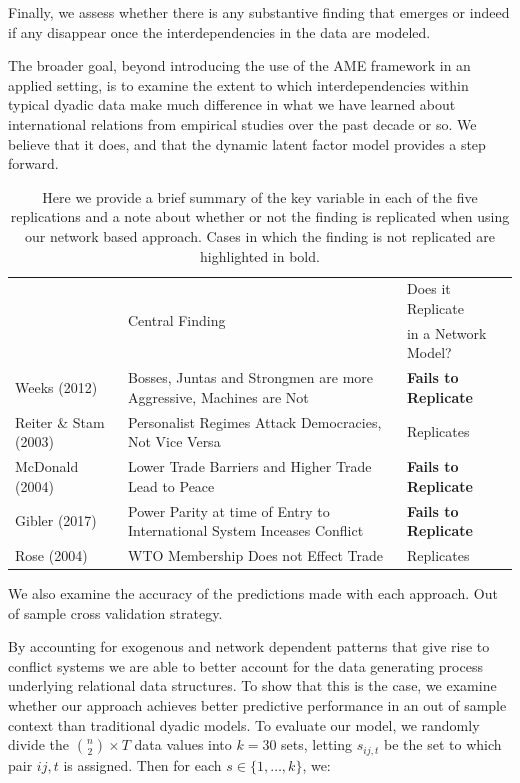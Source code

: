 Finally, we assess whether there is any substantive finding that emerges or indeed if any disappear once the interdependencies in the data are modeled.

The broader goal, beyond introducing the use of the AME framework in an applied setting, is to examine the extent to which interdependencies within typical dyadic data make much difference in what we have learned about international relations from empirical studies over the past decade or so.  We believe that it does, and that the dynamic latent factor model provides a step forward.

\begin{table}[ht]
\centering
	\begin{tabular}{l| p{7cm} l}
	& \multirow{2}{*}{Central Finding} & Does it Replicate \\ 
	& &  in a Network Model? \\
	\hline\hline
		Weeks (2012) & Bosses, Juntas and Strongmen are more Aggressive, Machines are Not & \textbf{Fails to Replicate} \\
		\hline
		Reiter \& Stam (2003) & Personalist Regimes Attack Democracies, Not Vice Versa & Replicates \\ 
		\hline
		McDonald (2004) & Lower Trade Barriers and Higher Trade Lead to Peace & \textbf{Fails to Replicate} \\ 
		\hline
		Gibler (2017) & Power Parity at time of Entry to International System Inceases Conflict & \textbf{Fails to Replicate} \\ 		
		\hline
		Rose (2004) & WTO Membership Does not Effect Trade & Replicates \\ 
	\hline\hline
	\end{tabular}
	\caption{Here we provide a brief summary of the key variable in each of the five replications and a note about whether or not the finding is replicated when using our network based approach. Cases in which the finding is not replicated are highlighted in bold.}
	\label{tab:modelFindingSumm}
\end{table}

We also examine the accuracy of the predictions made with each approach. Out of sample cross validation strategy. 

By accounting for exogenous and network dependent patterns that give rise to conflict systems we are able to better account for the data generating process underlying relational data structures. To show that this is the case, we examine whether our approach achieves better predictive performance in an out of sample context than traditional dyadic models. To evaluate our model, we randomly divide the $\binom n 2 \times T$ data values into $k=30$ sets, letting $s_{ij,t}$ be the set to which pair $ij,t$ is assigned. Then for each $s \in \{1,\ldots,k\}$, we:

